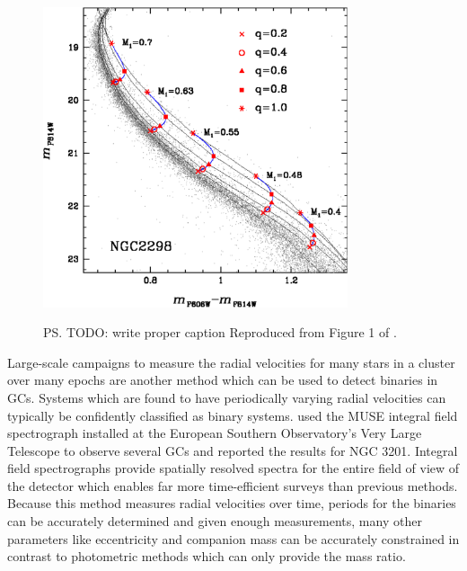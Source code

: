 \begin{figure}
	\centering
	\includegraphics[width=0.8\textwidth]{"./figures/main_sequence_binaries.pdf"}
	\label{fig:1/main_sequence_binaries}
	\caption{\ps{TODO: write proper caption} Reproduced from Figure 1 of \citet{Milone2012}.}
\end{figure}


Large-scale campaigns to measure the radial velocities for many stars in a cluster over many epochs
are another method which can be used to detect binaries in GCs. Systems which are found to have
periodically varying radial velocities can typically be confidently classified as binary systems.
\citet{Giesers2019} used the MUSE integral field spectrograph installed at the European Southern
Observatory's Very Large Telescope to observe several GCs and reported the results for NGC 3201.
Integral field spectrographs provide spatially resolved spectra for the entire field of view of the
detector which enables far more time-efficient surveys than previous methods. Because this method
measures radial velocities over time, periods for the binaries can be accurately determined and
given enough measurements, many other parameters like eccentricity and companion mass can be
accurately constrained in contrast to photometric methods which can only provide the mass ratio.

